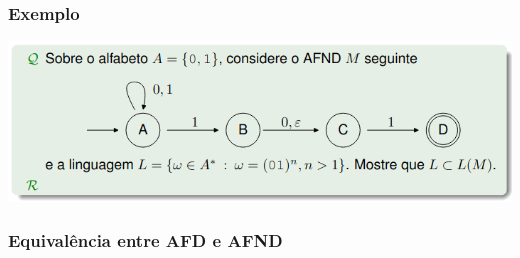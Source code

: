 \documentclass{article}
\begin{document}
\subsubsection{Exemplo}

\begin{center}
  \includegraphics[scale=0.4]{52}
\end{center}

\pagebreak

\subsubsection{Equivalência entre AFD e AFND}
\end{document}
